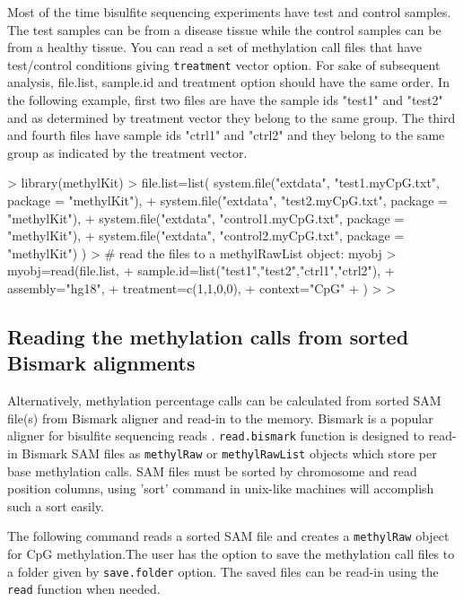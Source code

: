 \documentclass{article}
\begin{document}
Most of the time bisulfite sequencing experiments have test and control samples. The test samples can be from a disease tissue while the control samples can be from a healthy tissue. You can read a set of methylation call files that have test/control conditions giving \texttt{treatment} vector option. For sake of subsequent analysis, file.list, sample.id and treatment option should have the same order. In the following example, first two files are have the sample ids "test1" and "test2" and as determined by treatment vector they belong to the same group. The third and fourth files have sample ids "ctrl1" and "ctrl2" and they belong to the same group as indicated by the treatment vector.

\begin{Schunk}
\begin{Sinput}
> library(methylKit)
> file.list=list( system.file("extdata", "test1.myCpG.txt", package = "methylKit"),
+                 system.file("extdata", "test2.myCpG.txt", package = "methylKit"),
+                 system.file("extdata", "control1.myCpG.txt", package = "methylKit"),
+                 system.file("extdata", "control2.myCpG.txt", package = "methylKit") )
> # read the files to a methylRawList object: myobj
> myobj=read(file.list,
+            sample.id=list("test1","test2","ctrl1","ctrl2"),
+            assembly="hg18",
+            treatment=c(1,1,0,0),
+            context="CpG"
+            )
> 
> 
\end{Sinput}
\end{Schunk}

\subsection{Reading the methylation calls from sorted  Bismark alignments}
Alternatively, methylation percentage calls can be calculated from
sorted SAM file(s) from Bismark aligner and read-in to the memory. Bismark is a
popular aligner for bisulfite sequencing reads \cite{Krueger2011}. \texttt{read.bismark} function is designed to read-in Bismark SAM files as \texttt{methylRaw} or \texttt{methylRawList} objects which store per base methylation calls. SAM files must be sorted by chromosome and read position columns, using 'sort' command in unix-like machines will accomplish such a sort easily.

The following command reads a sorted SAM file and creates a \texttt{methylRaw} object for CpG methylation.The user has the option to save the methylation call files to a folder given by \texttt{save.folder} option. The saved files can be read-in using the \texttt{read} function when needed. 
\end{document}
